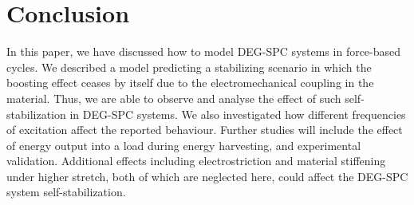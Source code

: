 \section{Conclusion}
\label{conclusion}
In this paper, we have discussed how to model DEG-SPC systems in force-based cycles. We described a model predicting a stabilizing scenario in which the boosting effect ceases by itself due to the electromechanical coupling in the material. Thus, we are able to observe and analyse the effect of such self-stabilization in DEG-SPC systems. We also investigated how different frequencies of excitation affect the reported behaviour. Further studies will include the effect of energy output into a load during energy harvesting, and experimental validation. Additional effects including electrostriction and material stiffening under higher stretch, both of which are neglected here, could affect the DEG-SPC system self-stabilization.












